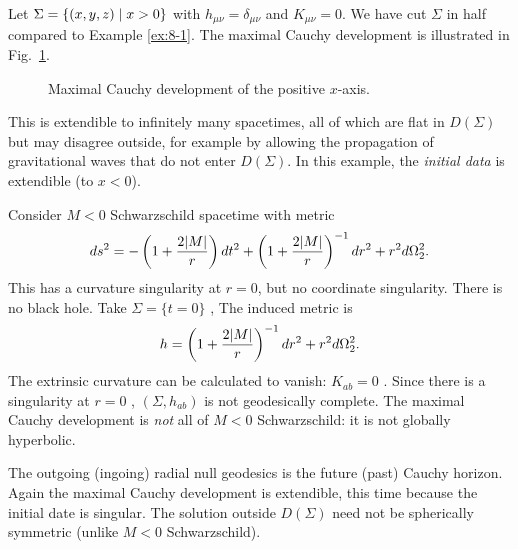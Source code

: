 \begin{example}[]
  Let $\Sigma = \{(x, y, z) \suchthat x > 0\}$ with $h_{\mu\nu} = \delta_{\mu\nu}$ and $K_{\mu\nu} = 0$.
  We have cut $\Sigma$ in half compared to Example \ref{ex:8-1}.
  The maximal Cauchy development is illustrated in Fig.~\ref{fig:l8f1}.
  \begin{figure}[tbhp]
    \centering
    \def\svgwidth{0.4\columnwidth}
    
    \caption{Maximal Cauchy development of the positive $x$-axis.}
    \label{fig:l8f1}
  \end{figure}
  This is extendible to infinitely many spacetimes, all of which are flat in $D(\Sigma)$ but may disagree outside, for example by allowing the propagation of gravitational waves that do not enter $D(\Sigma)$.
  In this example, the \emph{initial data} is extendible (to $x < 0$).
\end{example}

\begin{example}[]
  Consider $M< 0$ Schwarzschild spacetime with metric
   \begin{equation}
    ds^2 = -\left( 1 + \frac{2 \abs{M}}{r} \right) dt^2 + \left( 1 + \frac{2 \abs{M}}{r} \right)^{-1} dr^2 +r^2 d\Omega_2^2.
  \end{equation}
  This has a curvature singularity at $r = 0$, but no coordinate singularity. There is no black hole.
  Take $\Sigma  = \{t = 0\}$ , The induced metric is
  \begin{equation}
    h = \left( 1 + \frac{2 \abs{M}}{r} \right)^{-1} dr^2 + r^2 d\Omega_2^2.
  \end{equation}
  The extrinsic curvature can be calculated to vanish: $K_{ab} = 0$ .
  Since there is a singularity at $r = 0$ , $(\Sigma, h_{ab})$  is not geodesically complete.
  The maximal Cauchy development is \emph{not} all of $M< 0$ Schwarzschild: it is not globally hyperbolic.
   \begin{figure}[tbhp]
    \centering
    \def\svgwidth{0.4\columnwidth}
    
    \caption{}
    \label{fig:l8f2}
  \end{figure}
  The outgoing (ingoing) radial null geodesics is the future (past) Cauchy horizon.
  Again the maximal Cauchy development is extendible, this time because the initial date is singular.
  The solution outside $D(\Sigma)$ need not be spherically symmetric (unlike $M < 0$ Schwarzschild).
\end{example}

